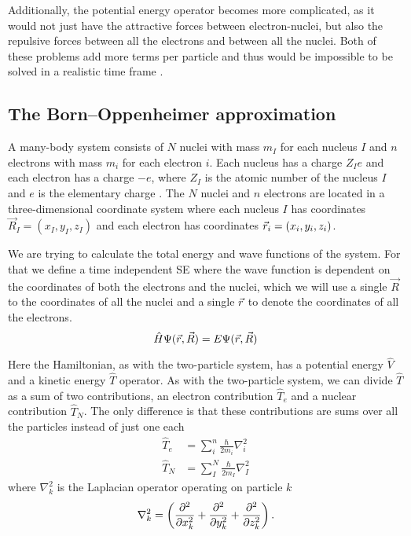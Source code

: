 \documentclass[../master_thesis.tex]{subfiles}
\begin{document}
Additionally, the potential energy operator becomes more complicated, as it
would not just have the attractive forces between electron-nuclei, but also the
repulsive forces between all the electrons and between all the nuclei. Both of
these problems add more terms per particle and thus would be impossible to be
solved in a realistic time frame \cite{Jensen:2017}.

\subsection{The Born--Oppenheimer approximation} \label{BO}
A many-body system consists of $N$ nuclei with mass $m_I$ for each nucleus $I$
and $n$ electrons with mass $m_i$ for each electron $i$. Each nucleus has a
charge $Z_Ie$ and each electron has a charge $-e$, where $Z_I$ is the atomic
number of the nucleus $I$  and $e$ is the elementary charge \cite{Atkins:2014}. The $N$ nuclei and $n$
electrons are located in a three-dimensional coordinate system where each nucleus $I$ has
coordinates $\vec{R}_I = (x_I, y_I, z_I)$ and each electron has coordinates
$\vec{r}_i = (x_i, y_i, z_i)$.

We are trying to calculate the total energy and wave functions of the system. For
that we define a time independent \ac{SE} where the wave function is dependent on
the coordinates of both the electrons and the nuclei, which we will use a single $\vec{R}$
to the coordinates of all the nuclei and a single $\vec{r}$ to denote the coordinates
of all the electrons.
\begin{equation}\label{eq:totalheliumSE}
  \hat{H}\Psi(\vec{r}, \vec{R}) = E \Psi(\vec{r}, \vec{R})
\end{equation}

Here the Hamiltonian, as with the two-particle system, has a potential energy $\hat{V}$ and a
kinetic energy $\hat{T}$ operator. As with the two-particle system, we can divide $\hat{T}$ as
a sum of two contributions, an electron contribution $\hat{T}_e$ and a nuclear contribution
$\hat{T}_N$. The only difference is that these contributions are sums over all
the particles  instead of just one each\cite{Cramer:2004}
\begin{align}
  \hat{T}_e &= \sum_i^n \frac{\hbar}{2m_i}\nabla^2_i\\
  \hat{T}_N &= \sum_I^N \frac{\hbar}{2m_I}\nabla^2_I
\end{align}
where $\nabla^2_k$ is the Laplacian operator operating on particle $k$
\begin{equation}
  \nabla^2_k = \left( \frac{\partial^2}{\partial x_k^2} + \frac{\partial^2}{\partial y_k^2} + \frac{\partial^2}{\partial z_k^2} \right).
\end{equation}
\end{document}
